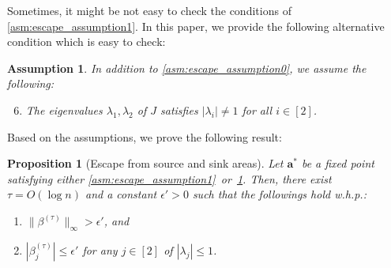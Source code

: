 \documentclass[letterpaper,11pt]{article}
\newtheorem{proposition}[theorem]{Proposition}
\newtheorem{assumption}[theorem]{Assumption}
\begin{document}
Sometimes, it might be not easy to check the conditions of \cref{asm:escape_assumption1}.
In this paper, we provide the following alternative condition which is easy to check:
\begin{assumption}\label{asm:escape_assumption2}
In addition to \cref{asm:escape_assumption0}, we assume the following:
\begin{enumerate}[label={\rm (A\arabic*)}]
\setcounter{enumi}{5}
\item The eigenvalues $\lambda_1,\lambda_2$ of $J$ satisfies $|\lambda_i|\neq 1$ for all $i\in[2]$. \label{asm:asm6}
\end{enumerate}
\end{assumption}

Based on the assumptions, we prove the following result:
\begin{proposition}[Escape from source and sink areas] \label{prop:escape}
Let $\mathbf{a}^*$ be a fixed point satisfying either \cref{asm:escape_assumption1}~or~\ref{asm:escape_assumption2}.
Then, there exist $\tau=O(\log n)$ and a constant $\epsilon'>0$ such that the followings hold w.h.p.:
\begin{enumerate}[label=(\roman*)]
\item $\|\beta^{(\tau)}\|_\infty > \epsilon'$, and
\item $|\beta^{(\tau)}_j| \leq \epsilon'$ for any $j\in [2]$ of $|\lambda_j|\leq 1$.
\end{enumerate}
\end{proposition}
\end{document}
